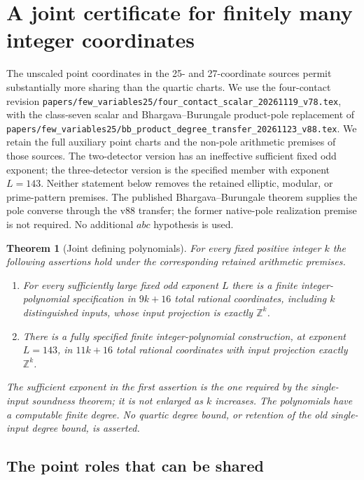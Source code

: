 \documentclass[11pt]{article}
\newtheorem{theorem}{Theorem}
\begin{document}
\section{A joint certificate for finitely many integer coordinates}
\label{sec:joint-few-variable}

The unscaled point coordinates in the 25- and 27-coordinate sources
permit substantially more sharing than the quartic charts.  We use
the four-contact revision
\nolinkurl{papers/few_variables25/four_contact_scalar_20261119_v78.tex},
with the class-seven scalar and Bhargava--Burungale product-pole
replacement of
\nolinkurl{papers/few_variables25/bb_product_degree_transfer_20261123_v88.tex}.
We retain the full auxiliary point charts and the non-pole arithmetic
premises of those sources.  The two-detector version has an ineffective
sufficient fixed odd exponent; the three-detector version is the
specified member with exponent $L=143$.  Neither statement below
removes the retained elliptic, modular, or prime-pattern premises.
The published Bhargava--Burungale theorem supplies the pole converse
through the v88 transfer; the former native-pole realization premise
is not required.  No additional $abc$ hypothesis is used.

\begin{theorem}[Joint defining polynomials]
\label{thm:joint-few-variable}
For every fixed positive integer $k$ the following assertions hold
under the corresponding retained arithmetic premises.
\begin{enumerate}
\item For every sufficiently large fixed odd exponent $L$ there is a
finite integer-polynomial specification in $9k+16$ total rational
coordinates, including $k$ distinguished inputs, whose input
projection is exactly $\mathbb Z^k$.
\item There is a fully specified finite integer-polynomial
construction, at exponent $L=143$, in $11k+16$ total rational
coordinates with input projection exactly $\mathbb Z^k$.
\end{enumerate}
The sufficient exponent in the first assertion is the one required
by the single-input soundness theorem; it is not enlarged as $k$
increases.  The polynomials have a computable finite degree.  No
quartic degree bound, or retention of the old single-input degree
bound, is asserted.
\end{theorem}

\subsection{The point roles that can be shared}
\end{document}
